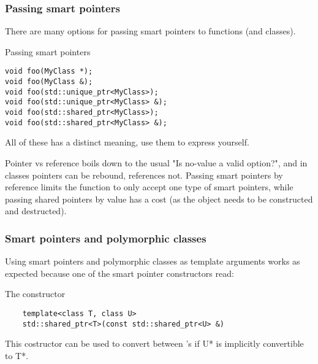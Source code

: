 \documentclass[11pt,a4paper,dvipsnames,usenames]{beamer}
\newcommand{\object}[1]{{\ttfamily \color{OliveGreen}#1}}
\newcommand{\std}[1]{{\ttfamily {\color{RoyalBlue} std::}{\color{OliveGreen}#1}}}
\newcommand{\sharedptr}{\std{shared\_ptr}}
\begin{document}
\begin{frame}[fragile]
  \frametitle{Passing smart pointers}

  There are many options for passing smart pointers to functions (and classes).

  \vspace{1em}
  
  \begin{exampleblock}{Passing smart pointers}
    \begin{lstlisting}
void foo(MyClass *);
void foo(MyClass &);
void foo(std::unique_ptr<MyClass>);
void foo(std::unique_ptr<MyClass> &);
void foo(std::shared_ptr<MyClass>);
void foo(std::shared_ptr<MyClass> &);
    \end{lstlisting}
  \end{exampleblock}

  \vspace{1em}

  All of these has a distinct meaning, use them to express yourself.

  \note
  {
    Pointer vs reference boils down to the usual "Is no-value a valid option?", and in 
    classes pointers can be rebound, references not. Passing smart pointers by reference
    limits the function to only accept one type of smart pointers, while passing
    shared pointers by value has a cost (as the object needs to be constructed and 
    destructed).
  }

\end{frame}

\begin{frame}[fragile]
  \frametitle{Smart pointers and polymorphic classes}

  Using smart pointers and polymorphic classes as template arguments works as expected
  because one of the smart pointer constructors read:

  \vspace{1em}
  
  \begin{exampleblock}{The \sharedptr{} {\color{codeblockcolor}constructor}}
    \begin{lstlisting}
    template<class T, class U>
    std::shared_ptr<T>(const std::shared_ptr<U> &)
    \end{lstlisting}
  \end{exampleblock}

  \vspace{1em}

  This costructor can be used to convert between \sharedptr{}'s if \object{U*} is implicitly convertible to \object{T*}.

\end{frame}
\end{document}
